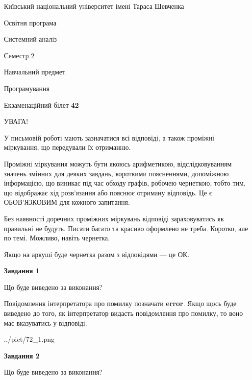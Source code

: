 \documentclass[12pt, ukrainian]{article}
\begin{document}
{{\begin {small}\par
{ \center  Київський національний університет імені Тараса Шевченка \par}
{\parbox {5 cm}{Освітня програма \hfill}{\parbox {7 cm}{Системний аналіз \hfill}}\parbox {6 cm}{\hfill Семестр 2}}\par
{\parbox {5 cm} {Навчальний предмет \hfill}\parbox {7 cm}{Програмування \hfill}\parbox {6cm}{\hfill}\par}\vspace{-7pt} \end{small}}{\center Екзаменаційний білет \No \textbf
{ 42 }\par}}
{
\begin {large}
УВАГА!

У письмовій роботі мають зазначатися всі відповіді, а також проміжні міркування, що передували їх отриманню.

Проміжні міркування можуть бути якоюсь арифметикою, відслідковуванням зна\-чень змінних для деяких завдань,
короткими поясненнями, допоміжною інформацією, що виникає під час обходу графів, робочею чернеткою,
тобто тим, що відображає хід розв’язання або пояснює отриману відповідь.
Це є ОБОВ’ЯЗКОВИМ для кожного запитання.

Без наявності доречних проміжних міркувань відповіді зараховуватись як правиль\-ні не будуть.
Писати багато та красиво оформлено не треба. Коротко, але по темі. Можли\-во, навіть чернетка.

Якщо на аркуші буде чернетка разом з відповідями --- це ОК.

\newpage

{\begin {center}\textbf{Завдання 1}\end {center}}\par
Що буде виведено за виконання?

Повідомлення інтерпретатора про помилку позначати \textbf{error}.
Якщо щось буде виведено до того, як інтерпретатор видасть повідомлення про помилку, 
то воно має вказуватись у відповіді. \par


\begin{center}
	{../pict/72_1.png}
\end{center}
\newpage

{\begin {center}\textbf{Завдання 2}\end {center}}\par
Що буде виведено за виконання?


\end{large}}
\end{document}
